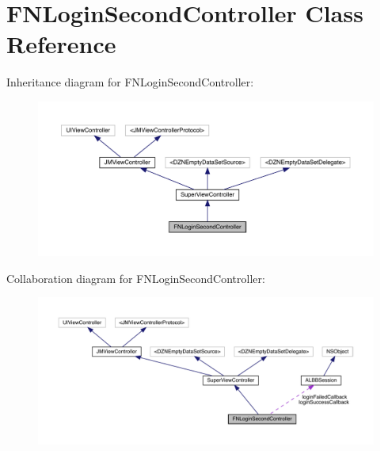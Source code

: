 \hypertarget{interface_f_n_login_second_controller}{}\section{F\+N\+Login\+Second\+Controller Class Reference}
\label{interface_f_n_login_second_controller}


Inheritance diagram for F\+N\+Login\+Second\+Controller\+:\nopagebreak
\begin{figure}[H]
\begin{center}
\leavevmode
\includegraphics[width=350pt]{interface_f_n_login_second_controller__inherit__graph}
\end{center}
\end{figure}


Collaboration diagram for F\+N\+Login\+Second\+Controller\+:\nopagebreak
\begin{figure}[H]
\begin{center}
\leavevmode
\includegraphics[width=350pt]{interface_f_n_login_second_controller__coll__graph}
\end{center}
\end{figure}
